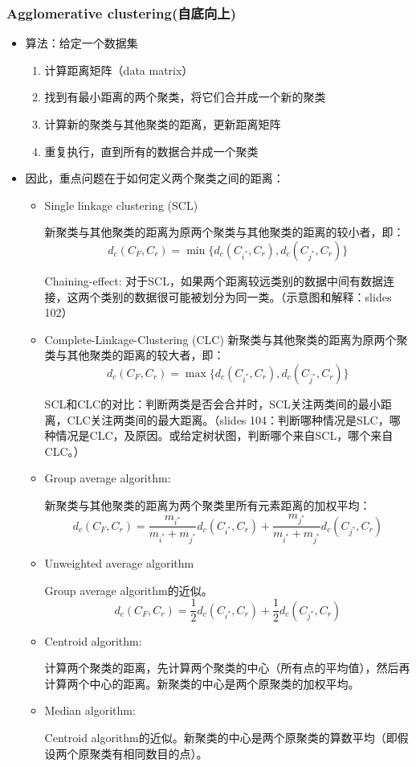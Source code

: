 \documentclass[12pt, a4paper, oneside]{ctexart}
\begin{document}
\subsubsection{Agglomerative clustering(自底向上)}
\begin{itemize}
    \item 算法：给定一个数据集
    \begin{enumerate}
        \item 计算距离矩阵（data matrix）
        \item 找到有最小距离的两个聚类，将它们合并成一个新的聚类
        \item 计算新的聚类与其他聚类的距离，更新距离矩阵
        \item 重复执行，直到所有的数据合并成一个聚类
    \end{enumerate}
    \item 因此，重点问题在于如何定义两个聚类之间的距离：
    \begin{itemize}
        \item Single linkage clustering (SCL)
        
        新聚类与其他聚类的距离为原两个聚类与其他聚类的距离的较小者，即：$$d_c(C_F,C_r)=\min\{d_c(C_{i^*}, C_r), d_c(C_{j^*}, C_r)\}$$
        \begin{tcolorbox}
            Chaining-effect: 对于SCL，如果两个距离较远类别的数据中间有数据连接，这两个类别的数据很可能被划分为同一类。（示意图和解释：slides 102）
        \end{tcolorbox}
        \item Complete-Linkage-Clustering (CLC)
        新聚类与其他聚类的距离为原两个聚类与其他聚类的距离的较大者，即：$$d_c(C_F,C_r)=\max\{d_c(C_{i^*}, C_r), d_c(C_{j^*}, C_r)\}$$
        \begin{tcolorbox}
            SCL和CLC的对比：判断两类是否会合并时，SCL关注两类间的最小距离，CLC关注两类间的最大距离。（slides 104：判断哪种情况是SLC，哪种情况是CLC，及原因。或给定树状图，判断哪个来自SCL，哪个来自CLC。）
        \end{tcolorbox}
        \item Group average algorithm:
        
        新聚类与其他聚类的距离为两个聚类里所有元素距离的加权平均：$$d_c(C_F,C_r)=\frac{m_{i^*}}{m_{i^*}+m_{j^*}}d_c(C_{i^*}, C_r)+\frac{m_{j^*}}{m_{i^*}+m_{j^*}} d_c(C_{j^*}, C_r)$$
        \item Unweighted average algorithm

        Group average algorithm的近似。$$d_c(C_F,C_r)=\frac{1}{2}d_c(C_{i^*}, C_r)+\frac{1}{2} d_c(C_{j^*}, C_r)$$
        \item Centroid algorithm:
        
        计算两个聚类的距离，先计算两个聚类的中心（所有点的平均值），然后再计算两个中心的距离。新聚类的中心是两个原聚类的加权平均。

        \item Median algorithm:
        
        Centroid algorithm的近似。新聚类的中心是两个原聚类的算数平均（即假设两个原聚类有相同数目的点）。



    \end{itemize}
\end{itemize}
\end{document}
